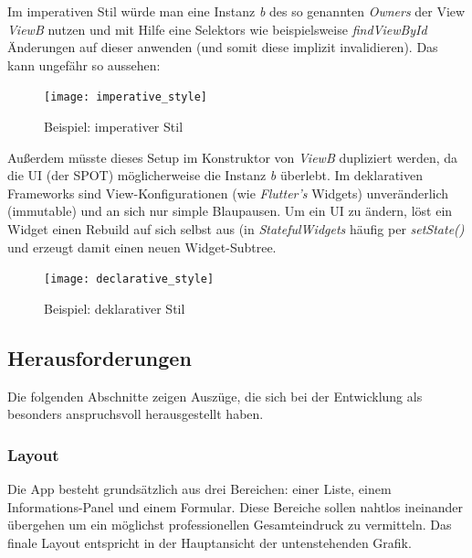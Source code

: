 Im imperativen Stil würde man eine Instanz \textit{b} des so
genannten \textit{Owners} der View \textit{ViewB} nutzen
und mit Hilfe eine Selektors wie beispielsweise \textit{findViewById}
Änderungen auf dieser anwenden (und somit diese implizit invalidieren).
Das kann ungefähr so aussehen:

\begin{figure}[H]
    \centering
    \texttt{[image: imperative\_style]}
    \caption{Beispiel: imperativer Stil}
\end{figure}

Außerdem müsste dieses Setup im Konstruktor von \textit{ViewB} dupliziert
werden, da die UI (der \ac{SPOT}) möglicherweise die Instanz \textit{b} überlebt.
Im deklarativen Frameworks sind View-Konfigurationen
(wie \textit{Flutter's} Widgets) unveränderlich (immutable) und an sich
nur simple Blaupausen. Um ein UI zu ändern, löst ein Widget einen Rebuild
auf sich selbst aus (in \textit{StatefulWidgets} häufig per \textit{setState()}
und erzeugt damit einen neuen Widget-Subtree.

\begin{figure}[H]
    \centering
    \texttt{[image: declarative\_style]}
    \caption{Beispiel: deklarativer Stil}
\end{figure}



\subsection{Herausforderungen}

Die folgenden Abschnitte zeigen Auszüge, die sich bei der Entwicklung
als besonders anspruchsvoll herausgestellt haben.

\subsubsection{Layout}

Die App besteht grundsätzlich aus drei Bereichen:
einer Liste, einem Informations-Panel und einem Formular.
Diese Bereiche sollen nahtlos ineinander übergehen um ein
möglichst professionellen Gesamteindruck zu vermitteln.
Das finale Layout entspricht in der Hauptansicht der untenstehenden Grafik.

